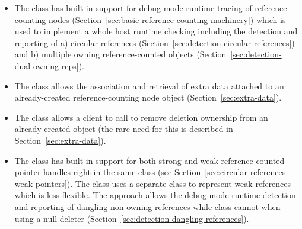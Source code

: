 \documentclass[pdf,ps2pdf,11pt]{SANDreport}
\begin{document}
\begin{itemize}

{}\item The {} class has built-in support for debug-mode
runtime tracing of reference-counting nodes
(Section~\ref{sec:basic-reference-counting-machinery}) which is used
to implement a whole host runtime checking including the detection and
reporting of a) circular references
(Section~\ref{sec:detection-circular-references}) and b) multiple
owning reference-counted objects
(Section~\ref{sec:detection-dual-owning-rcps}).

{}\item The {} class allows the association and retrieval of
extra data attached to an already-created reference-counting node
object (Section~\ref{sec:extra-data}).

{}\item The {} class allows a client to call
{} to remove deletion ownership from an already-created
{} object (the rare need for this is described in
Section~\ref{sec:extra-data}).

{}\item The {} class has built-in support for both strong and
weak reference-counted pointer handles right in the same class (see
Section~\ref{sec:circular-references-weak-pointers}).  The
{} class uses a separate
{} class to represent weak references which is
less flexible.  The {} approach allows the debug-mode runtime
detection and reporting of dangling non-owning references while
{} class cannot when using a null deleter
(Section~\ref{sec:detection-dangling-references}).

\end{itemize}
\end{document}
